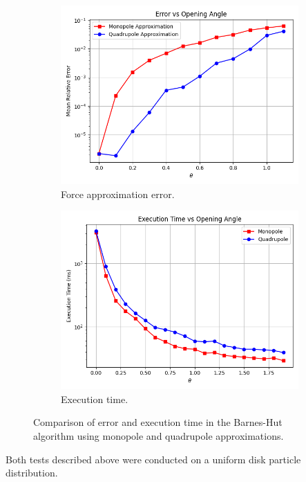 \begin{figure}[htp]
    \centering
    \begin{subfigure}[b]{0.47\textwidth}
        \centering
        \includegraphics[width=\textwidth]{img/error-vs-theta.png}
        \caption{Force approximation error.}
        \label{fig:bh-force-error}
    \end{subfigure}
    \hfill
    \begin{subfigure}[b]{0.47\textwidth}
        \centering
        \includegraphics[width=\textwidth]{img/bh-time.png}
        \caption{Execution time.}
        \label{fig:bh-time}
    \end{subfigure}
    \caption{Comparison of error and execution time in the Barnes-Hut algorithm using monopole and quadrupole approximations.}
    \label{fig:bh-analysis}
\end{figure}
Both tests described above were conducted on a uniform disk particle distribution.

